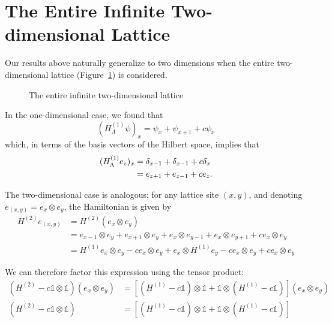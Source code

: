 \documentclass{article}
\newcommand{\hl}{H_\Lambda}
\numberwithin{equation}{section}
\numberwithin{theorem}{section}
\numberwithin{proposition}{section}
\numberwithin{lemma}{section}
\numberwithin{corollary}{section}
\numberwithin{definition}{section}
\begin{document}
\section{The Entire Infinite Two-dimensional Lattice}

Our results above naturally generalize to two dimensions when the entire two-dimensional lattice (Figure~\ref{fig:2dentire}) is considered.

\begin{figure}
	\caption{The entire infinite two-dimensional lattice \label{fig:2dentire}}
	\centering
\end{figure}
		
In the one-dimensional case, we found that 
	\[
	(\hl^{(1)} \psi)_x = \psi_x + \psi_{x+1} + c \psi_x
	\]
which, in terms of the basis vectors of the Hilbert space, implies that
	\begin{align}
	\label{definec}
	(\hl^{(1)} e_z)_x &= \delta_{x-1} + \delta_{x-1} + c\delta_x \notag \\
		&= e_{z+1} + e_{z-1} + ce_z.
	\end{align}
	
The two-dimensional case is analogous; for any lattice site $(x,y)$, and denoting $e_{(x,y)} = e_x \otimes e_y$, the Hamiltonian is given by
	\begin{align*}
	H^{(2)} e_{(x,y)} &= H^{(2)} (e_x \otimes e_y) \\
		&= e_{x-1} \otimes e_y + e_{x+1} \otimes e_y + e_x \otimes e_{y-1} + e_x \otimes e_{y+1} + ce_x \otimes e_y \\
		&= H^{(1)}e_x \otimes e_y - ce_x \otimes e_y + e_x \otimes H^{(1)} e_y - ce_x \otimes e_y + ce_x \otimes e_y
	\end{align*}

We can therefore factor this expression using the tensor product:
	\begin{align}
	(H^{(2)} - c \mathds{1} \otimes \mathds{1}) (e_x \otimes e_y) &= [(H^{(1)} - c\mathds{1}) \otimes \mathds{1} + \mathds{1} \otimes ({H}^{(1)} - c\mathds{1})] (e_x \otimes e_y) \nonumber \\
	(H^{(2)} - c \mathds{1} \otimes \mathds{1}) &= [(H^{(1)} - c\mathds{1}) \otimes \mathds{1} + \mathds{1} \otimes ({H}^{(1)} - c\mathds{1})]
	\end{align}
\end{document}
